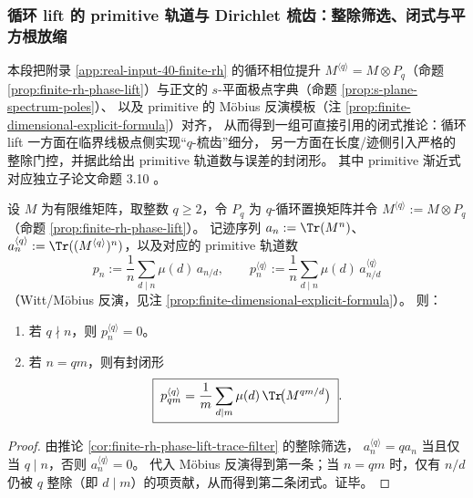 \subsubsection{循环 lift 的 primitive 轨道与 Dirichlet 梳齿：整除筛选、闭式与平方根放缩}\label{subsubsec:zeta-online-kernel-cyclic-lift-primitives}
本段把附录 \ref{app:real-input-40-finite-rh} 的循环相位提升 \(M^{\langle q\rangle}=M\otimes P_q\)（命题 \ref{prop:finite-rh-phase-lift}）与正文的
\(s\)-平面极点字典（命题 \ref{prop:s-plane-spectrum-poles}）、
以及 primitive 的 Möbius 反演模板（注 \ref{prop:finite-dimensional-explicit-formula}）对齐，
从而得到一组可直接引用的闭式推论：循环 lift 一方面在临界线极点侧实现“\(q\)-梳齿”细分，
另一方面在长度/迹侧引入严格的整除门控，并据此给出 primitive 轨道数与误差的封闭形。
其中 primitive 渐近式对应独立子论文命题 3.10
\cite{Internal2026SelfDualSynchronisationKernelCyclotomicTwists}。

\begin{corollary}\label{cor:zeta-cyclic-lift-primitive-orbits}
设 \(M\) 为有限维矩阵，取整数 \(q\ge 2\)，令 \(P_q\) 为 \(q\)-循环置换矩阵并令 \(M^{\langle q\rangle}:=M\otimes P_q\)（命题 \ref{prop:finite-rh-phase-lift}）。
记迹序列 \(a_n:=\Tr(M^n)\)、\(a_n^{\langle q\rangle}:=\Tr((M^{\langle q\rangle})^n)\)，以及对应的 primitive 轨道数
\[
p_n:=\frac{1}{n}\sum_{d\mid n}\mu(d)\,a_{n/d},
\qquad
p_n^{\langle q\rangle}:=\frac{1}{n}\sum_{d\mid n}\mu(d)\,a^{\langle q\rangle}_{n/d}
\]
（Witt/Möbius 反演，见注 \ref{prop:finite-dimensional-explicit-formula}）。
则：
\begin{enumerate}
  \item 若 \(q\nmid n\)，则 \(p_n^{\langle q\rangle}=0\)。
  \item 若 \(n=qm\)，则有封闭形
  \[
  \boxed{\;
  p_{qm}^{\langle q\rangle}
  =\frac{1}{m}\sum_{d\mid m}\mu(d)\,\Tr\!\bigl(M^{qm/d}\bigr)\; }.
  \]
\end{enumerate}
\end{corollary}
\begin{proof}
由推论 \ref{cor:finite-rh-phase-lift-trace-filter} 的整除筛选，
\(
a_n^{\langle q\rangle}=q a_n
\)
当且仅当 \(q\mid n\)，否则 \(a_n^{\langle q\rangle}=0\)。
代入 Möbius 反演得到第一条；当 \(n=qm\) 时，仅有 \(n/d\) 仍被 \(q\) 整除（即 \(d\mid m\)）的项贡献，从而得到第二条闭式。证毕。
\end{proof}

